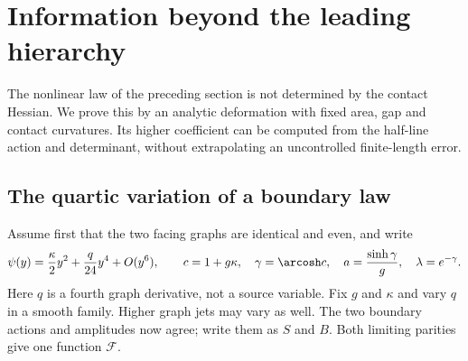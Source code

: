 \section{Information beyond the leading hierarchy}
\label{sec:v4-nonlinear}
The nonlinear law of the preceding section is not determined by the
contact Hessian. We prove this by an analytic deformation with fixed
area, gap and contact curvatures. Its higher coefficient can be computed
from the half-line action and determinant, without extrapolating an
uncontrolled finite-length error.

\subsection{The quartic variation of a boundary law}
Assume first that the two facing graphs are identical and even, and
write
\begin{equation}\label{eq:v4-even-jet}
 \psi(y)=\frac\kappa2 y^2+\frac q{24}y^4+O(y^6),\qquad
 c=1+g\kappa,\quad \gamma=\arcosh c,\quad
 a=\frac{\sinh\gamma}{g},\quad \lambda=e^{-\gamma}.
\end{equation}
Here $q$ is a fourth graph derivative, not a source variable. Fix $g$
and $\kappa$ and vary $q$ in a smooth family. Higher graph jets may
vary as well. The two boundary actions and amplitudes now agree;
write them as $S$ and $B$. Both limiting parities give one function
$\mathcal F$.

